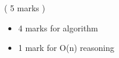 \begin{INUTILE}
\begin{markingScheme}{	\vspace{15pt}
	( 5 marks )

	\vspace{10pt}
	\begin{itemize}
	\item 4 marks for algorithm
	\item 1 mark for O(n) reasoning
	\end{itemize}
}
\end{markingScheme}

\end{INUTILE}
